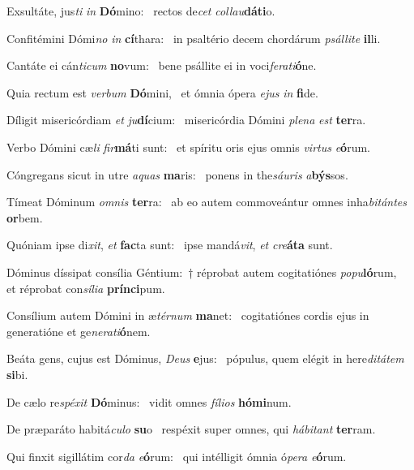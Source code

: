 \item Exsultáte, jus\textit{ti} \textit{in} \textbf{Dó}mino:~\psstar{} rectos de\textit{cet} \textit{collau}\textbf{dá}\textbf{ti}o.
\item Confitémini Dómi\textit{no} \textit{in} \textbf{cí}thara:~\psstar{} in psaltério decem chordárum \textit{psállite} \textbf{il}li.
\item Cantáte ei cán\textit{ticum} \textbf{no}vum:~\psstar{} bene psállite ei in voci\textit{ferati}\textbf{ó}ne.
\item Quia rectum est \textit{verbum} \textbf{Dó}mini,~\psstar{} et ómnia ópera \textit{ejus} \textit{in} \textbf{fi}de.
\item Díligit misericórdiam \textit{et} \textit{ju}\textbf{dí}cium:~\psstar{} misericórdia Dómini \textit{plena} \textit{est} \textbf{ter}ra.
\item Verbo Dómini cæ\textit{li} \textit{fir}\textbf{má}ti sunt:~\psstar{} et spíritu oris ejus omnis \textit{virtus} \textit{e}\textbf{ó}rum.
\item Cóngregans sicut in utre \textit{aquas} \textbf{ma}ris:~\psstar{} ponens in the\textit{sáuris} \textit{a}\textbf{býs}sos.
\item Tímeat Dóminum \textit{omnis} \textbf{ter}ra:~\psstar{} ab eo autem commoveántur omnes inha\textit{bitántes} \textbf{or}bem.
\item Quóniam ipse di\textit{xit}, \textit{et} \textbf{fac}ta sunt:~\psstar{} ipse mandá\textit{vit}, \textit{et} \textit{cre}\textbf{á}\textbf{ta} sunt.
\item Dóminus díssipat consília Géntium:~† réprobat autem cogitatiónes \textit{popu}\textbf{ló}rum,~\psstar{} et réprobat con\textit{sília} \textbf{prín}\textbf{ci}pum.
\item Consílium autem Dómini in æ\textit{térnum} \textbf{ma}net:~\psstar{} cogitatiónes cordis ejus in generatióne et ge\textit{nerati}\textbf{ó}nem.
\item Beáta gens, cujus est Dóminus, \textit{Deus} \textbf{e}jus:~\psstar{} pópulus, quem elégit in here\textit{ditátem} \textbf{si}bi.
\item De cælo re\textit{spéxit} \textbf{Dó}minus:~\psstar{} vidit omnes \textit{fílios} \textbf{hó}\textbf{mi}num.
\item De præparáto habitá\textit{culo} \textbf{su}o~\psstar{} respéxit super omnes, qui \textit{hábitant} \textbf{ter}ram.
\item Qui finxit sigillátim cor\textit{da} \textit{e}\textbf{ó}rum:~\psstar{} qui intélligit ómnia ó\textit{pera} \textit{e}\textbf{ó}rum.
